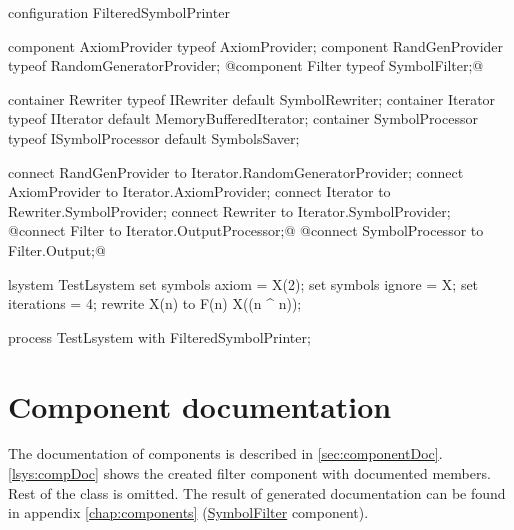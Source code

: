 \begin{Lsystem}[label=lsys:lastFilter,caption={Test of extended \emph{SymbolPrinter} process configuration with created filter component}]
configuration FilteredSymbolPrinter {
	component AxiomProvider typeof AxiomProvider;
	component RandGenProvider typeof RandomGeneratorProvider;
	@component Filter typeof SymbolFilter;@

	container Rewriter typeof IRewriter default SymbolRewriter;
	container Iterator typeof IIterator
		default MemoryBufferedIterator;
	container SymbolProcessor typeof ISymbolProcessor
		default SymbolsSaver;

	connect RandGenProvider to Iterator.RandomGeneratorProvider;
	connect AxiomProvider to Iterator.AxiomProvider;
	connect Iterator to Rewriter.SymbolProvider;
	connect Rewriter to Iterator.SymbolProvider;
	@connect Filter to Iterator.OutputProcessor;@
	@connect SymbolProcessor to Filter.Output;@
}

lsystem TestLsystem {
	set symbols axiom = X(2);
	set symbols ignore = X;
	set iterations = 4;
	rewrite X(n) to F(n) X((n ^ n));
}

process TestLsystem with FilteredSymbolPrinter;
\end{Lsystem}


\section{Component documentation}

The documentation of components is described in \autoref{sec:componentDoc}.
\autoref{lsys:compDoc} shows the created filter component with documented members.
Rest of the class is omitted.
The result of generated documentation can be found in appendix \ref{chap:components} (\hyperref[ExamplePlugin.Components.SymbolFilter]{SymbolFilter} component).

